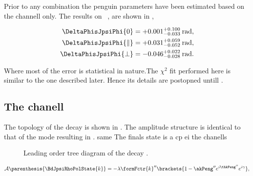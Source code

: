 
Prior to any combination the penguin parameters have been estimated based on the \BsJpsiKst channell only.
The results on ~\cite{bsjpsikst-paper}, are shown in ,

\begin{subequations}
  \label{delta_phis_jpsikst}
  \begin{align}
    \DeltaPhisJpsiPhi{0}         & = +0.001^{+0.100}_{-0.033} \:\text{rad},\\
    \DeltaPhisJpsiPhi{\parallel} & = +0.031^{+0.059}_{-0.052} \:\text{rad},\\
    \DeltaPhisJpsiPhi{\perp}     & = -0.046^{+0.022}_{-0.028} \:\text{rad}.
  \end{align}
\end{subequations}

\noindent Where most of the error is statistical in nature.The $\chi^2$ fit performed here is similar
to the one described later. Hence its details are postopned untill .


\subsection{The \BdJpsiRho chanell}
The topology of the \BdJpsiRho decay is shown in . The amplitude structure is identical
to that of the \BsJpsiKst mode resulting in . same The finals state is a cp ei the chanells

\begin{figure}[h]
  \centering
  {\sffamily }
  \caption{Leading order tree diagram of the decay \BdJpsiRho.}
  \label{bs2jpsirho_diagram}
\end{figure}

\begin{equation}
  \mathcal{A} \parenthesis{\BdJpsiRhoPolState{k}} = -\lambda \formFctr{k}'' \brackets{ 1 - \akPeng'' e^{i\thkPeng''} e^{i\gamma} },
  \label{bsjpsirho_amp}
\end{equation}

